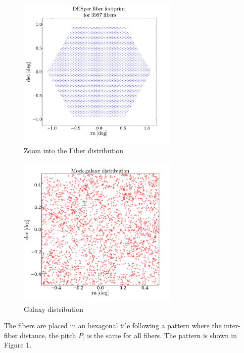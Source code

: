 \documentclass{article}
\begin{document}
\begin{figure}
\begin{center}
\includegraphics[keepaspectratio=true,width=0.7\textwidth]{DES_fibers.pdf}
\caption{Zoom into the Fiber distribution}
\end{center}
\end{figure}

\begin{figure}
\begin{center}
\includegraphics[keepaspectratio=true,width=0.7\textwidth]{mock_gals.pdf}
\caption{Galaxy distribution}
\end{center}
\end{figure}

The fibers are placed in an hexagonal tile following a pattern where
the inter-fiber distance, the pitch $P$, is the same for all
fibers. The pattern is shown in Figure 1. 
\end{document}

